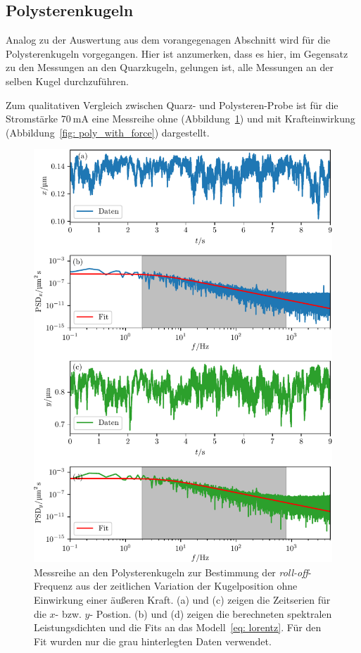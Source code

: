 

\FloatBarrier

\newpage
\subsection{Polysterenkugeln}
Analog zu der Auswertung aus dem vorangegenagen Abschnitt wird für die Polysterenkugeln vorgegangen.
Hier ist anzumerken, dass es hier, im Gegensatz zu den Messungen an den Quarzkugeln, gelungen ist, alle
Messungen an der selben Kugel durchzuführen.

Zum qualitativen Vergleich zwischen Quarz- und Polysteren-Probe ist für die
Stromstärke $\SI{70}{\milli\ampere}$ eine Messreihe ohne (Abbildung~\ref{fig: poly_without_force}) und
mit Krafteinwirkung (Abbildung~\ref{fig: poly_with_force}) dargestellt.
\begin{figure}
  \centering
  \includegraphics[scale = 1]{../analysis/data/i_quarz/70mA/results/without_force_70mA.pdf}
  \caption{Messreihe an den Polysterenkugeln zur Bestimmung der \emph{roll-off}-Frequenz aus der zeitlichen Variation der Kugelposition ohne Einwirkung einer äußeren Kraft.
  (a) und (c) zeigen die Zeitserien für die $x$- bzw. $y$- Postion. (b) und (d) zeigen die berechneten spektralen Leistungsdichten und die Fits an das
  Modell~\eqref{eq: lorentz}. Für den Fit wurden nur die grau hinterlegten Daten verwendet.}
  \label{fig: poly_without_force}
\end{figure}
